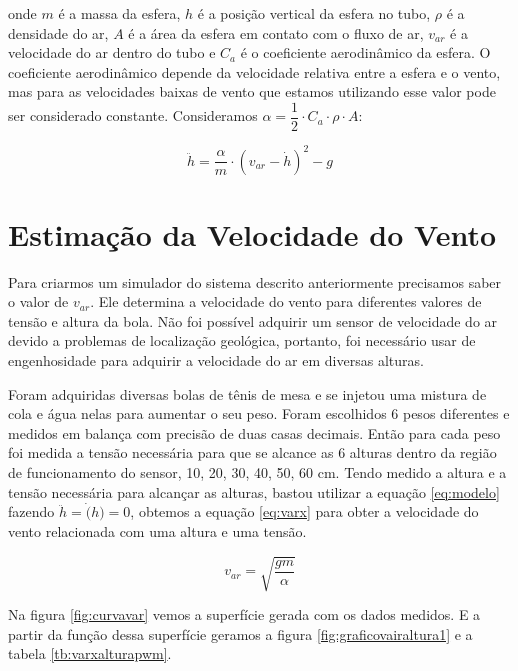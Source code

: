 onde $m$ é a massa da esfera, $h$ é a posição vertical da esfera no tubo, $\rho$ é a densidade do ar, $A$ é a área da esfera em contato com o fluxo de ar, $v_{ar}$ é a velocidade do ar dentro do tubo e $C_a$ é o coeficiente aerodinâmico da esfera. O coeficiente aerodinâmico depende da velocidade relativa entre a esfera e o vento, mas para as velocidades baixas de vento que estamos utilizando esse valor pode ser considerado constante. Consideramos $\alpha= \dfrac{1}{2} \cdot C_a \cdot \rho \cdot A$:


\begin{equation} \label{eq:modelo}
\ddot{h}=\dfrac{\alpha}{m}\cdot (v_{ar}-\dot{h})^2-g
\end{equation}

\section{Estimação da Velocidade do Vento}

Para criarmos um simulador do sistema descrito anteriormente precisamos saber o valor de $v_{ar}$. Ele determina a velocidade do vento para diferentes valores de tensão e altura da bola. Não foi possível adquirir um sensor de velocidade do ar devido a problemas de localização geológica, portanto, foi necessário usar de engenhosidade para adquirir a velocidade do ar em diversas alturas.


Foram adquiridas diversas bolas de tênis de mesa e se injetou uma mistura de cola e água nelas para aumentar o seu peso. Foram escolhidos 6 pesos diferentes e medidos em balança com precisão de duas casas decimais. Então para cada peso foi medida a tensão necessária para que se alcance as 6 alturas dentro da região de funcionamento do sensor, 10, 20, 30, 40, 50, 60 cm. Tendo medido a altura e a tensão necessária para alcançar as alturas, bastou utilizar a equação \eqref{eq:modelo} fazendo $\ddot{h}=\dot(h)=0$, obtemos a equação \ref{eq:varx} para obter a velocidade do vento relacionada com uma altura e uma tensão.

\begin{equation}\label{eq:varx}
v_{ar}=\sqrt{\dfrac{gm}{\alpha}}
\end{equation}

Na figura \ref{fig:curvavar} vemos a superfície gerada com os dados medidos. E a partir da função dessa superfície geramos a figura \ref{fig:graficovairaltura1} e a tabela \ref{tb:varxalturapwm}.

